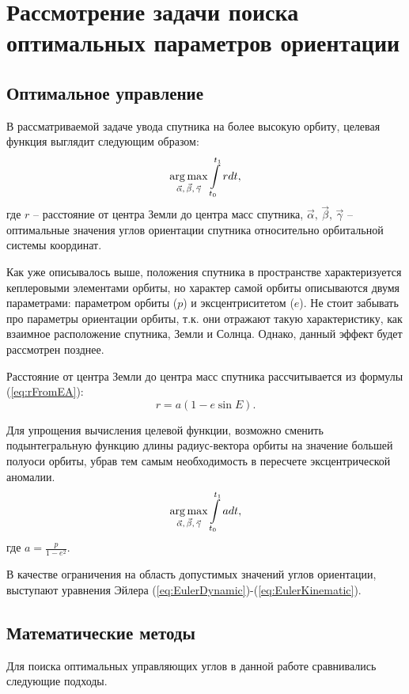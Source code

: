 \chapter{Рассмотрение задачи поиска оптимальных параметров ориентации}
\section{Оптимальное управление}
\noindent\indent В рассматриваемой задаче увода спутника на более высокую орбиту,
целевая функция выглядит следующим образом:
\begin{equation} \label{eq:IntMaxFullEq}
  \operatorname*{arg\,max}\limits_{\vec{\alpha},\,\vec{\beta},\,\vec{\gamma}}\int\limits_{t_0}^{t_1} r dt,
\end{equation}
где $r$ -- расстояние от центра Земли до центра масс спутника, $\vec{\alpha},\,
\vec{\beta},\,\vec{\gamma}$ -- оптимальные значения углов ориентации спутника
относительно орбитальной системы координат.\par
    Как уже описывалось выше, положения спутника в пространстве характеризуется
кеплеровыми элементами орбиты, но характер самой орбиты описываются двумя параметрами:
параметром орбиты ($p$) и эксцентриситетом ($e$). Не стоит забывать про параметры ориентации
орбиты, т.к. они отражают такую характеристику, как взаимное расположение спутника,
Земли и Солнца. Однако, данный эффект будет рассмотрен позднее.\par
    Расстояние от центра Земли до центра масс спутника рассчитывается из формулы
(\ref{eq:rFromEA}):
\begin{equation}
    r = a(1 - e\sin E).
\end{equation}\par
    Для упрощения вычисления целевой функции, возможно сменить подынтегральную
функцию длины радиус-вектора орбиты на значение большей полуоси орбиты,
убрав тем самым необходимость в пересчете эксцентрической аномалии.
\begin{equation} \label{eq:IntMaxFullEq}
  \operatorname*{arg\,max}\limits_{\vec{\alpha},\,\vec{\beta},\,\vec{\gamma}}\int\limits_{t_0}^{t_1} a dt,
\end{equation}
где $a = \frac{p}{1 - e^2}$.\par
    В качестве ограничения на область допустимых значений углов ориентации, выступают
уравнения Эйлера (\ref{eq:EulerDynamic})-(\ref{eq:EulerKinematic}).
\section{Математические методы}
\noindent\indent Для поиска оптимальных управляющих углов в данной работе сравнивались
следующие подходы.
